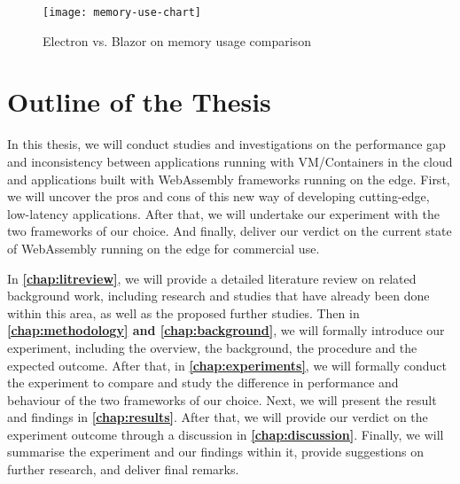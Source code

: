 \bigskip
\begin{figure}[hp]
\centering
\texttt{[image: memory-use-chart]}
\caption{\footnotesize{Electron vs. Blazor on memory usage comparison \cite{int40}}}
\captionsetup{aboveskip=0pt,font=it}
\end{figure}
\bigskip

\section{Outline of the Thesis}
\bigskip

In this thesis, we will conduct studies and investigations on the performance gap and inconsistency between applications running with VM/Containers in the cloud and applications built with WebAssembly frameworks running on the edge. First, we will uncover the pros and cons of this new way of developing cutting-edge, low-latency applications. After that, we will undertake our experiment with the two frameworks of our choice. And finally, deliver our verdict on the current state of WebAssembly running on the edge for commercial use.

In \textbf{\autoref{chap:litreview}}, we will provide a detailed literature review on related background work, including research and studies that have already been done within this area, as well as the proposed further studies. Then in \textbf{\autoref{chap:methodology} and \autoref{chap:background}}, we will formally introduce our experiment, including the overview, the background, the procedure and the expected outcome. After that, in \textbf{\autoref{chap:experiments}}, we will formally conduct the experiment to compare and study the difference in performance and behaviour of the two frameworks of our choice. Next, we will present the result and findings in \textbf{\autoref{chap:results}}. After that, we will provide our verdict on the experiment outcome through a discussion in \textbf{\autoref{chap:discussion}}. Finally, we will summarise the experiment and our findings within it, provide suggestions on further research, and deliver final remarks.